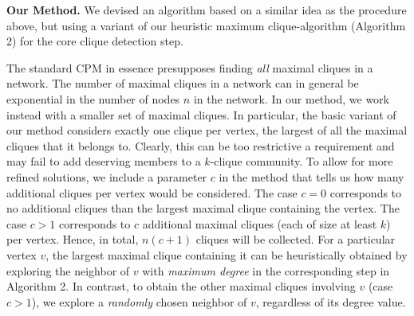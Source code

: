 {\bf Our Method. } We devised an algorithm based on a similar idea as the procedure
above, but using a variant of our heuristic maximum clique-algorithm 
(Algorithm 2) for the core clique detection step. 

The standard CPM in essence presupposes finding {\em all} maximal cliques in a network.
The number of maximal cliques in a network can in general be exponential in the number of nodes $n$ in the network. In our method, we work instead with a smaller set of maximal cliques. In particular, the basic variant of our method considers exactly one clique per vertex, the largest of all the maximal cliques that it belongs to. Clearly, this can be too restrictive a requirement and may fail to add deserving members to a $k$-clique community. 
To allow for more refined solutions, we include a parameter $c$
in the method that tells us how many additional cliques per vertex would be considered.
The case $c=0$ corresponds to no additional cliques than the largest maximal clique containing the vertex. The case $c>1$ corresponds to $c$ additional maximal cliques (each of size at least $k$)
per vertex. Hence, in total, $n(c+1)$ cliques will be collected. For a particular vertex $v$, the largest maximal clique containing it 
can be heuristically obtained by exploring the neighbor of $v$ with {\em maximum degree} 
in the corresponding step in Algorithm 2.
In contrast, to obtain the other maximal cliques involving $v$ (case $c>1$),
we explore a {\em randomly} chosen neighbor of $v$, regardless of its degree value.




